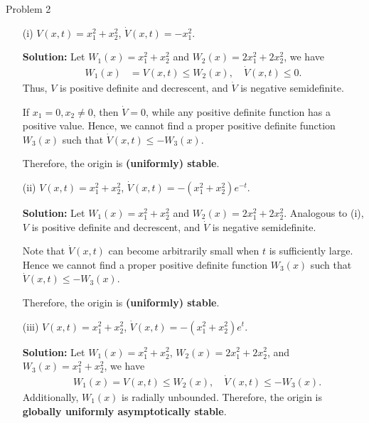 \documentclass[8pt]{beamer}
\begin{document}
\begin{frame}[t]{Problem 2}

\begin{itemize}
    \item[(i)] $V(x,t)=x_1^2+x_2^2$, $\dot V(x,t)=-x_1^2$.
    
    {\bf Solution:} Let $W_1(x)=x_1^2+x_2^2$ and $W_2(x)=2x_1^2+2x_2^2$, we have 
    \begin{align*}
        W_1(x)&=V(x,t) \le W_2(x),\quad\dot V(x,t) \le 0.
    \end{align*}
    Thus, $V$ is positive definite and decrescent, and $\dot{V}$ is negative semidefinite. 
    
    If $x_1=0, x_2\neq 0$, then $\dot{V}=0$, while any positive definite function has a positive value. Hence, we cannot find a proper positive definite function $W_3(x)$ such that $\dot V(x,t) \le -W_3(x)$. 
    
    Therefore, the origin is \textbf{(uniformly) stable}.

    \item[(ii)] $V(x,t)=x_1^2+x_2^2$, $\dot V(x,t)=-(x_1^2+x_2^2)e^{-t}$.
    
    {\bf Solution:} Let $W_1(x)=x_1^2+x_2^2$ and $W_2(x)=2x_1^2+2x_2^2$. Analogous to (i), $V$ is positive definite and decrescent, and $\dot{V}$ is negative semidefinite.
    
    Note that $\dot V(x,t)$ can become arbitrarily small when $t$ is sufficiently large. 
    Hence we cannot find a proper positive definite function $W_3(x)$ such that $\dot V(x,t) \le -W_3(x)$. 
    
    Therefore, the origin is \textbf{(uniformly) stable}.

    \item[(iii)] $V(x,t)=x_1^2+x_2^2$, $\dot V(x,t)=-(x_1^2+x_2^2)e^{t}$.
    
    {\bf Solution:} Let $W_1(x)=x_1^2+x_2^2$,  $W_2(x)=2x_1^2+2x_2^2$, and $W_3(x)=x_1^2+x_2^2$, we have 
    \begin{align*}
        &W_1(x)=V(x,t) \le W_2(x),\quad \dot V(x,t) \le -W_3(x).
    \end{align*}
    Additionally, $W_1(x)$ is radially unbounded. Therefore, the origin is \textbf{globally uniformly asymptotically stable}.
\end{itemize}
\end{frame}
\end{document}
